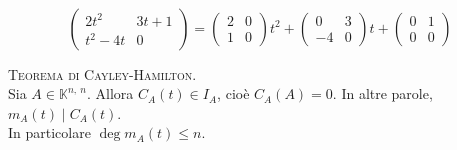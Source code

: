 \begin{example}~{}
	\begin{equation*}
		\left(\begin{array}{cc}
			2t^2 & 3t+1 \\
			t^2-4t & 0
		\end{array}\right)=\left(\begin{array}{cc}
		2 & 0 \\
		1 & 0
	\end{array}\right)t^2+\left(\begin{array}{cc}
	0 & 3 \\
	-4 & 0
\end{array}\right)t+\left(\begin{array}{cc}
0 & 1 \\
0 & 0
\end{array}\right)
	\end{equation*}
\end{example}
\begin{theorema}\textsc{Teorema di Cayley-Hamilton}.\\
Sia $A\in \mathbb{K}^{n,\ n}$. Allora $C_A\left(t\right)\in I_A$, cioè $C_A\left(A\right)=0$. In altre parole, $m_A\left(t\right)\mid C_A\left(t\right)$.\\
In particolare $\deg m_A\left(t\right)\leq n$.
\end{theorema}
